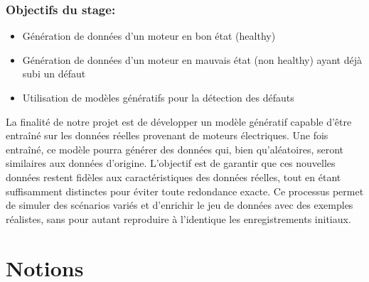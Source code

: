 \subsubsection{Objectifs du stage:}

\begin{itemize}
  \item Génération de données d'un moteur en bon état (healthy)
  \item Génération de données d'un moteur en mauvais état (non healthy) ayant déjà subi
        un défaut
  \item Utilisation de modèles génératifs pour la détection des défauts
\end{itemize}

La finalité de notre projet est de développer un modèle génératif capable
d'être entraîné sur les données réelles provenant de moteurs électriques. Une
fois entraîné, ce modèle pourra générer des données qui, bien qu'aléatoires,
seront similaires aux données d'origine. L'objectif est de garantir que ces
nouvelles données restent fidèles aux caractéristiques des données réelles,
tout en étant suffisamment distinctes pour éviter toute redondance exacte. Ce
processus permet de simuler des scénarios variés et d'enrichir le jeu de
données avec des exemples réalistes, sans pour autant reproduire à l'identique
les enregistrements initiaux.

\section{Notions}


